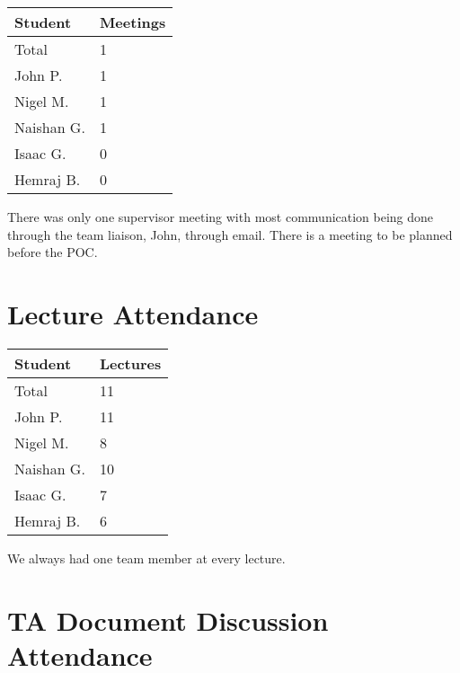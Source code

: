 \documentclass{article}
\begin{document}
\begin{table}[H]
\centering
\begin{tabular}{ll}
\toprule
\textbf{Student} & \textbf{Meetings}\\
\midrule
Total & 1\\
John P. & 1\\
Nigel M. & 1\\
Naishan G. & 1\\
Isaac G. & 0\\
Hemraj B. & 0\\
\bottomrule
\end{tabular}
\end{table}

There was only one supervisor meeting with most communication being done through the team liaison, John, through email.
There is a meeting to be planned before the POC.

\section{Lecture Attendance}


\begin{table}[H]
\centering
\begin{tabular}{ll}
\toprule
\textbf{Student} & \textbf{Lectures}\\
\midrule
Total & 11\\
John P. & 11\\
Nigel M. & 8\\
Naishan G. & 10\\
Isaac G. & 7\\
Hemraj B. & 6\\
\bottomrule
\end{tabular}
\end{table}

We always had one team member at every lecture.

\section{TA Document Discussion Attendance}
\end{document}
